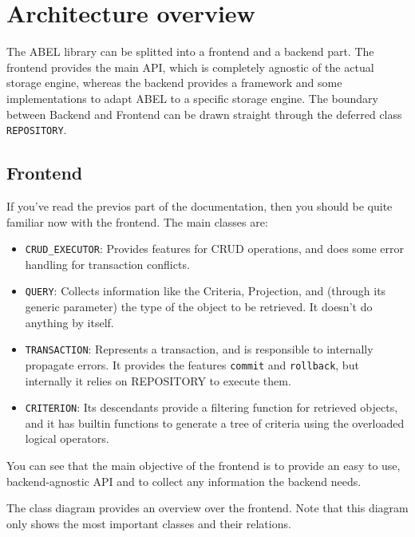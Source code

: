 \section{Architecture overview}

The ABEL library can be splitted into a frontend and a backend part.
The frontend provides the main API, which is completely agnostic of the actual storage engine, 
whereas the backend provides a framework and some implementations to adapt ABEL to a specific storage engine.
The boundary between Backend and Frontend can be drawn straight through the deferred class \lstinline!REPOSITORY!.

\subsection{Frontend}

If you've read the previos part of the documentation, then you should be quite familiar now with the frontend.
The main classes are:
 \begin{itemize}
  \item \lstinline!CRUD_EXECUTOR!: Provides features for CRUD operations, and does some error handling for transaction conflicts.
  \item \lstinline!QUERY!: Collects information like the Criteria, Projection, and (through its generic parameter) the type of the object to be retrieved. It doesn't do anything by itself.
  \item \lstinline!TRANSACTION!: Represents a transaction, and is responsible to internally propagate errors. It provides the features \lstinline!commit! and \lstinline!rollback!, but internally it relies on REPOSITORY to execute them.
  \item \lstinline!CRITERION!: Its descendants provide a filtering function for retrieved objects, and it has builtin functions to generate a tree of criteria using the overloaded logical operators.
 \end{itemize}

You can see that the main objective of the frontend is to provide an easy to use, backend-agnostic API and to collect any information the backend needs.

The class diagram provides an overview over the frontend.
Note that this diagram only shows the most important classes and their relations.

